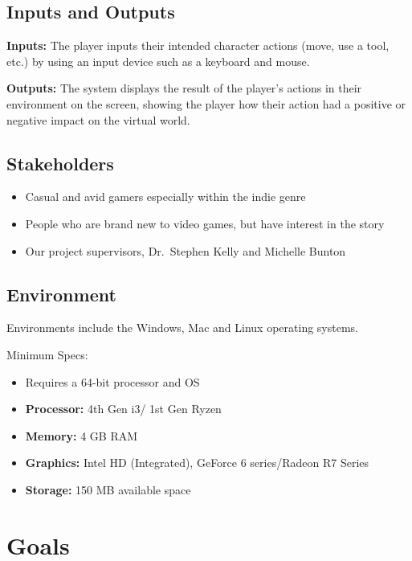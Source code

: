 \documentclass{article}
\begin{document}
\subsection{Inputs and Outputs}

\noindent \textbf{Inputs:} The player inputs their intended character actions (move, 
use a tool, etc.) by using an input device such as a keyboard and mouse. \newline

\noindent \textbf{Outputs:} The system displays the result of the player's actions in their 
environment on the screen, showing the player how their action had a positive or 
negative impact on the virtual world.

\subsection{Stakeholders}

\begin{itemize}
\item{Casual and avid gamers especially within the indie genre}
\item{People who are brand new to video games, but have interest in the story}
\item{Our project supervisors, Dr.\ Stephen Kelly and Michelle Bunton}
\end{itemize}

\subsection{Environment}

Environments include the Windows, Mac and Linux operating systems.

Minimum Specs:
\begin{itemize}
\item{Requires a 64-bit processor and OS}
\item{\textbf{Processor:} 4th Gen i3/ 1st Gen Ryzen}
\item{\textbf{Memory:} 4 GB RAM}
\item{\textbf{Graphics:} Intel HD (Integrated), GeForce 6 series/Radeon R7 Series}
\item{\textbf{Storage:} 150 MB available space}
\end{itemize}


\section{Goals}
\end{document}
